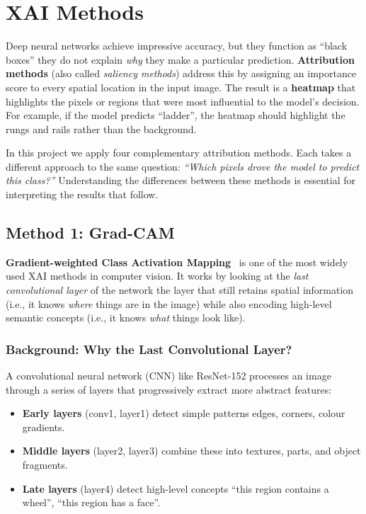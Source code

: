 \documentclass[12pt, a4paper]{article}
\begin{document}
\section{XAI Methods}
\label{sec:xai_methods}

Deep neural networks achieve impressive accuracy, but they function as
``black boxes'' they do not explain \emph{why} they make a particular
prediction.  \textbf{Attribution methods} (also called \emph{saliency methods})
address this by assigning an importance score to every spatial location in the
input image.  The result is a \textbf{heatmap} that highlights the pixels or
regions that were most influential to the model's decision.  For example, if
the model predicts ``ladder'', the heatmap should highlight the rungs and
rails rather than the background.

In this project we apply four complementary attribution methods.  Each takes a
different approach to the same question:
\textit{``Which pixels drove the model to predict this class?''}
Understanding the differences between these methods is essential for
interpreting the results that follow.


\subsection{Method 1: Grad-CAM}

\textbf{Gradient-weighted Class Activation Mapping}~\cite{selvaraju2017gradcam}
is one of the most widely used XAI methods in computer vision.  It works by
looking at the \emph{last convolutional layer} of the network the layer
that still retains spatial information (i.e., it knows \emph{where} things are
in the image) while also encoding high-level semantic concepts (i.e., it knows
\emph{what} things look like).

\subsubsection{Background: Why the Last Convolutional Layer?}

A convolutional neural network (CNN) like ResNet-152 processes an image through
a series of layers that progressively extract more abstract features:
\begin{itemize}[leftmargin=*]
    \item \textbf{Early layers} (conv1, layer1) detect simple patterns 
          edges, corners, colour gradients.
    \item \textbf{Middle layers} (layer2, layer3) combine these into textures,
          parts, and object fragments.
    \item \textbf{Late layers} (layer4) detect high-level concepts ``this
          region contains a wheel'', ``this region has a face''.
\end{itemize}
\end{document}
